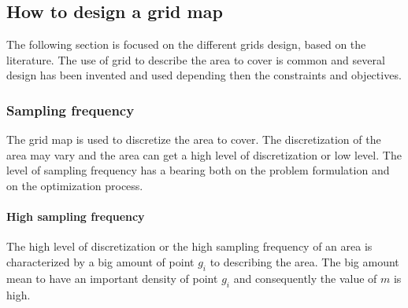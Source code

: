 \subsection{How to design a grid map} \label{sec:GridMap}%

The following section is focused on the different grids design, based on the literature. The use of grid to describe the area to cover is common and several design has been invented and used depending then the constraints and objectives.  


\subsubsection{Sampling frequency} %
The grid map is used to discretize the area to cover. The discretization of the area may vary and the area can get a high level of discretization or low level. The level of sampling frequency has a bearing both on the problem formulation and on the optimization process.

\paragraph*{High sampling frequency}
The high level of discretization or the high sampling frequency of an area is characterized by a big amount of point $g_i$ to describing the area. The big amount mean to have an important density of point $g_i$ and consequently the value of $m$ is high. 

